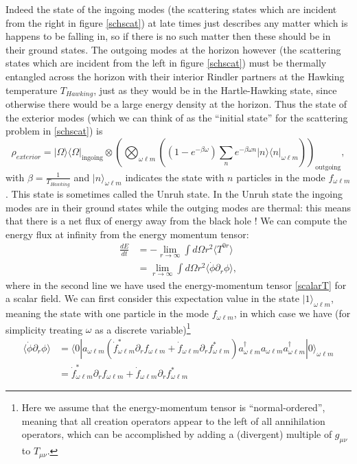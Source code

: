 \documentclass[12pt]{article}
\newcommand{\be}{\begin{equation}}
\newcommand{\ee}{\end{equation}}
\newcommand{\lan}{\langle}
\newcommand{\ran}{\rangle}
\begin{document}
Indeed the state of the ingoing modes (the scattering states which are incident from the right in figure \ref{schscat}) at late times just describes any matter which is happens to be falling in, so if there is no such matter then these should be in their ground states.  The outgoing modes at the horizon however (the scattering states which are incident from the left in figure \ref{schscat}) must be thermally entangled across the horizon with their interior Rindler partners at the Hawking temperature $T_{\mathit{Hawking}}$, just as they would be in the Hartle-Hawking state, since otherwise there would be a large energy density at the horizon.  Thus the state of the exterior modes (which we can think of as the ``initial state'' for the scattering problem in \ref{schscat}) is
\be\label{BHmodestate}
\rho_{\mathit{exterior}}=|\Omega\ran\lan\Omega|_{\mathrm{ingoing}}\otimes \left(\bigotimes_{\omega \ell m}\left((1-e^{-\beta \omega})\sum_ne^{-\beta \omega n}|n\ran\lan n|_{\omega \ell m}\right)\right)_{\mathrm{outgoing}},
\ee
with $\beta=\frac{1}{T_{\mathit{Hawking}}}$ and $|n\ran_{\omega \ell m}$ indicates the state with $n$ particles in the mode $f_{\omega \ell m}$.  This state is sometimes called the Unruh state.  In the Unruh state the ingoing modes are in their ground states while the outging modes are thermal: this means that there is a net flux of energy away from the black hole \cite{Hawking:1974sw}!  We can compute the energy flux at infinity from the energy momentum tensor:
\begin{align}\nonumber
\frac{dE}{dt}&=-\lim_{r\to\infty}\int d\Omega r^2 \lan T^{0r}\ran\\
&=\lim_{r\to\infty}\int d\Omega r^2\lan\dot{\phi}\partial_r \phi\ran,
\end{align}
where in the second line we have used the energy-momentum tensor \eqref{scalarT} for a scalar field.  We can first consider this expectation value in the state $|1\ran_{\omega \ell m}$, meaning the state with one particle in the mode $f_{\omega\ell m}$, in which case we have (for simplicity treating $\omega$ as a discrete variable)\footnote{Here we assume that the energy-momentum tensor is ``normal-ordered'', meaning that all creation operators appear to the left of all annihilation operators, which can be accomplished by adding a (divergent) multiple of $g_{\mu\nu}$ to $T_{\mu\nu}$.}
\begin{align}\nonumber
\lan \dot{\phi}\partial_r \phi\ran &=\lan 0|a_{\omega \ell m}\left(\dot{f}_{\omega\ell m}^*\partial_r f_{\omega\ell m}+\dot{f}_{\omega\ell m}\partial_r f^*_{\omega\ell m}\right)a^\dagger_{\omega\ell m} a_{\omega\ell m}a^\dagger_{\omega\ell m}|0\ran_{\omega\ell m}\\
&=\dot{f}_{\omega\ell m}^*\partial_r f_{\omega\ell m}+\dot{f}_{\omega\ell m}\partial_r f^*_{\omega\ell m}
\end{align}
\end{document}
